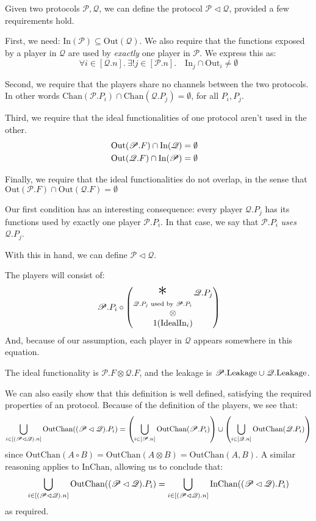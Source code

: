 \begin{definition}
Given two protocols $\mathscr{P}, \mathscr{Q}$,
we can define the protocol $\mathscr{P} \lhd \mathscr{Q}$,
provided a few requirements hold.

First, we need: $\text{In}(\mathscr{P}) \subseteq \text{Out}(\mathscr{Q})$.
We also require that the functions exposed by a player in $\mathscr{Q}$
are used by \emph{exactly} one player in $\mathscr{P}$.
We express this as:
\[
  \forall i \in [\mathscr{Q}.n].\ \exists! j \in [\mathscr{P}.n].\quad \text{In}_j \cap \text{Out}_i \neq \emptyset
\]

Second, we require that the players share no channels between the two
protocols.
In other words $\text{Chan}(\mathscr{P}.P_i) \cap \text{Chan}(\mathscr{Q}.P_j) = \emptyset$, for all $P_i, P_j$.

Third, we require that the ideal functionalities of one protocol aren't used in the other.
$$
\begin{aligned}
&\text{Out}(\mathscr{P}.F) \cap \text{In}(\mathscr{Q}) = \emptyset\cr
&\text{Out}(\mathscr{Q}.F) \cap \text{In}(\mathscr{P}) = \emptyset
\end{aligned}
$$

Finally, we require that the ideal functionalities do not overlap, 
  in the sense that $\text{Out}(\mathscr{P}.F) \cap \text{Out}(\mathscr{Q}.F) = \emptyset$

Our first condition has an interesting consequence: every player $\mathscr{Q}.P_j$
has its functions used by exactly one player $\mathscr{P}.P_i$.
In that case, we say that $\mathscr{P}.P_i$ \emph{uses} $\mathscr{Q}.P_j$.

With this in hand, we can define $\mathscr{P} \lhd \mathscr{Q}$.

The players will consist of:
$$
  \mathscr{P}.P_i \circ
  \begin{pmatrix}
    {\displaystyle \bigast_{\mathscr{Q}.P_j \text{ used by } \mathscr{P}.P_i } \mathscr{Q}.P_j} \cr
    \otimes\cr
    1(\tx{IdealIn}_i)
  \end{pmatrix}
$$
And, because of our assumption, each player in $\mathscr{Q}$ appears
somewhere in this equation.

The ideal functionality is $\mathscr{P}.F \otimes \mathscr{Q}.F$,
and the leakage is $\mathscr{P}.\text{Leakage} \cup \mathscr{Q}.\text{Leakage}$.

We can also easily show that this definition is well defined, satisfying
the required properties of an protocol.
Because of the definition of the players, we see that:
$$
  \bigcup_{i \in [(\mathscr{P} \lhd \mathscr{Q}).n]} \text{OutChan}((\mathscr{P} \lhd \mathscr{Q}).{P_i})
  = \left(\bigcup_{i \in [\mathscr{P}.n]} \text{OutChan}(\mathscr{P}.P_i)\right) \cup
  \left(\bigcup_{i \in [\mathscr{Q}.n]} \text{OutChan}(\mathscr{Q}.P_i)\right)
$$
  since $\text{OutChan}(A \circ B) = \text{OutChan}(A \otimes B) = \text{OutChan}(A, B)$.
A similar reasoning applies to $\text{InChan}$, allowing us to conclude that:
$$
  \bigcup_{i \in [(\mathscr{P} \lhd \mathscr{Q}).n]} \text{OutChan}((\mathscr{P} \lhd \mathscr{Q}).{P_i}) =
  \bigcup_{i \in [(\mathscr{P} \lhd \mathscr{Q}).n]} \text{InChan}((\mathscr{P} \lhd \mathscr{Q}).{P_i})
$$
as required.


\end{definition}
